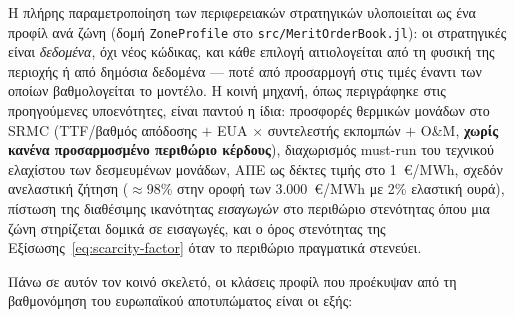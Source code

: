 Η πλήρης παραμετροποίηση των περιφερειακών στρατηγικών υλοποιείται ως ένα προφίλ ανά ζώνη (δομή \texttt{ZoneProfile} στο \texttt{src/MeritOrderBook.jl}): οι στρατηγικές είναι \emph{δεδομένα}, όχι νέος κώδικας, και κάθε επιλογή αιτιολογείται από τη φυσική της περιοχής ή από δημόσια δεδομένα --- ποτέ από προσαρμογή στις τιμές έναντι των οποίων βαθμολογείται το μοντέλο. Η κοινή μηχανή, όπως περιγράφηκε στις προηγούμενες υποενότητες, είναι παντού η ίδια: προσφορές θερμικών μονάδων στο SRMC (TTF/βαθμός απόδοσης $+$ EUA $\times$ συντελεστής εκπομπών $+$ O\&M, \textbf{χωρίς κανένα προσαρμοσμένο περιθώριο κέρδους}), διαχωρισμός must-run του τεχνικού ελαχίστου των δεσμευμένων μονάδων, ΑΠΕ ως δέκτες τιμής στο 1~€/MWh, σχεδόν ανελαστική ζήτηση ($\approx$98\% στην οροφή των 3.000~€/MWh με 2\% ελαστική ουρά), πίστωση της διαθέσιμης ικανότητας \emph{εισαγωγών} στο περιθώριο στενότητας όπου μια ζώνη στηρίζεται δομικά σε εισαγωγές, και ο όρος στενότητας της Εξίσωσης~\ref{eq:scarcity-factor} όταν το περιθώριο πραγματικά στενεύει.

Πάνω σε αυτόν τον κοινό σκελετό, οι κλάσεις προφίλ που προέκυψαν από τη βαθμονόμηση του ευρωπαϊκού αποτυπώματος είναι οι εξής:

